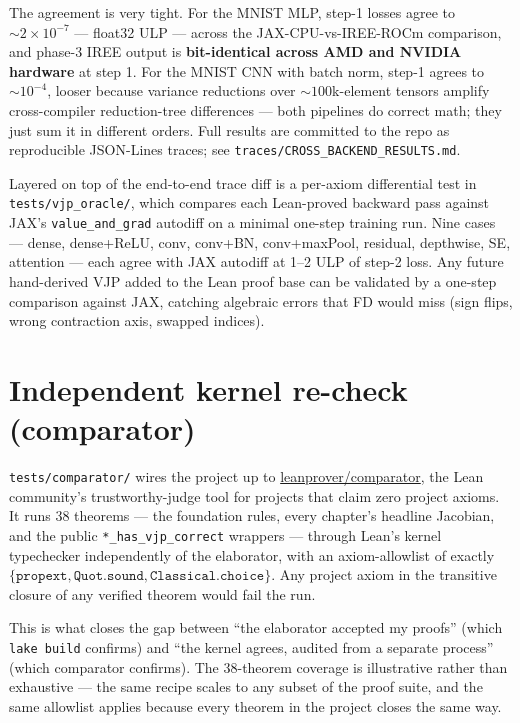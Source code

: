 The agreement is very tight. For the MNIST MLP, step-1 losses agree
to \(\sim 2 \times 10^{-7}\) --- float32 ULP --- across the
JAX-CPU-vs-IREE-ROCm comparison, and phase-3 IREE output is
\textbf{bit-identical across AMD and NVIDIA hardware} at step 1.
For the MNIST CNN with batch norm, step-1 agrees to
\(\sim 10^{-4}\), looser because variance reductions over
\(\sim 100\)k-element tensors amplify cross-compiler reduction-tree
differences --- both pipelines do correct math; they just sum it
in different orders. Full results are committed to the repo as
reproducible JSON-Lines traces; see
\texttt{traces/CROSS\_BACKEND\_RESULTS.md}.

Layered on top of the end-to-end trace diff is a per-axiom
differential test in \texttt{tests/vjp\_oracle/}, which compares
each Lean-proved backward pass against JAX's
\texttt{value\_and\_grad} autodiff on a minimal one-step training
run. Nine cases --- dense, dense+ReLU, conv, conv+BN, conv+maxPool,
residual, depthwise, SE, attention --- each agree with JAX autodiff
at 1--2 ULP of step-2 loss. Any future hand-derived VJP added to
the Lean proof base can be validated by a one-step comparison
against JAX, catching algebraic errors that FD would miss (sign
flips, wrong contraction axis, swapped indices).

\section{Independent kernel re-check (comparator)}

\texttt{tests/comparator/} wires the project up to
\href{https://github.com/leanprover/comparator}{leanprover/comparator},
the Lean community's trustworthy-judge tool for projects that claim
zero project axioms. It runs 38 theorems --- the foundation rules,
every chapter's headline Jacobian, and the public
\texttt{*\_has\_vjp\_correct} wrappers --- through Lean's kernel
typechecker independently of the elaborator, with an axiom-allowlist
of exactly \(\{\texttt{propext}, \texttt{Quot.sound},
\texttt{Classical.choice}\}\). Any project axiom in the transitive
closure of any verified theorem would fail the run.

This is what closes the gap between ``the elaborator accepted my
proofs'' (which \texttt{lake build} confirms) and ``the kernel
agrees, audited from a separate process'' (which comparator confirms).
The 38-theorem coverage is illustrative rather than exhaustive ---
the same recipe scales to any subset of the proof suite, and the
same allowlist applies because every theorem in the project closes
the same way.

